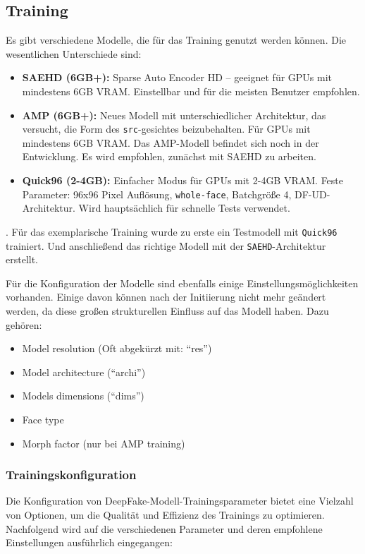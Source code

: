 \subsection*{Training}\label{subsec:training}
Es gibt verschiedene Modelle, die für das Training genutzt werden können.
Die wesentlichen Unterschiede sind:
\begin{itemize}
    \item \textbf{SAEHD (6GB+):} Sparse Auto Encoder HD – geeignet für GPUs mit mindestens 6GB VRAM.
    Einstellbar und für die meisten Benutzer empfohlen.
    \item \textbf{AMP (6GB+):} Neues Modell mit unterschiedlicher Architektur, das versucht, die Form des \texttt{src}-gesichtes beizubehalten.
    Für GPUs mit mindestens 6GB VRAM.
Das AMP-Modell befindet sich noch in der Entwicklung.
    Es wird empfohlen, zunächst mit SAEHD zu arbeiten.
    \item \textbf{Quick96 (2-4GB):} Einfacher Modus für GPUs mit 2-4GB VRAM.
    Feste Parameter: 96x96 Pixel Auflösung, \texttt{whole-face}, Batchgröße 4, DF-UD-Architektur.
    Wird hauptsächlich für schnelle Tests verwendet.
\end{itemize}.
Für das exemplarische Training wurde zu erste ein Testmodell mit \texttt{Quick96} trainiert.
Und anschließend das richtige Modell mit der \texttt{SAEHD}-Architektur erstellt.

Für die Konfiguration der Modelle sind ebenfalls einige Einstellungsmöglichkeiten vorhanden.
Einige davon können nach der Initiierung nicht mehr geändert werden, da diese großen strukturellen Einfluss auf das Modell haben.
Dazu gehören:
\begin{itemize}
    \item Model resolution (Oft abgekürzt mit: ``res'')
    \item Model architecture (``archi'')
    \item Models dimensions (``dims'')
    \item Face type
    \item Morph factor (nur bei AMP training)
\end{itemize}

\subsubsection*{Trainingskonfiguration}
Die Konfiguration von DeepFake-Modell-Trainingsparameter bietet eine Vielzahl von Optionen, um die Qualität und Effizienz des Trainings zu optimieren.
Nachfolgend wird auf die verschiedenen Parameter und deren empfohlene Einstellungen ausführlich eingegangen:


